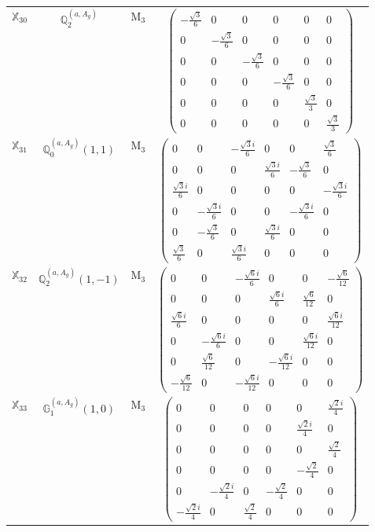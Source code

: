 \documentclass[fleqn,10pt,landscape]{article}
\begin{document}
\begin{itemize}
\begin{center}
\begin{longtable}{c|c|c|c}
$ \mathbb{X}_{30} $ & $\mathbb{Q}_{2}^{(a,A_{g})}$ & M$_{3}$ & $\begin{pmatrix} - \frac{\sqrt{3}}{6} & 0 & 0 & 0 & 0 & 0 \\ 0 & - \frac{\sqrt{3}}{6} & 0 & 0 & 0 & 0 \\ 0 & 0 & - \frac{\sqrt{3}}{6} & 0 & 0 & 0 \\ 0 & 0 & 0 & - \frac{\sqrt{3}}{6} & 0 & 0 \\ 0 & 0 & 0 & 0 & \frac{\sqrt{3}}{3} & 0 \\ 0 & 0 & 0 & 0 & 0 & \frac{\sqrt{3}}{3} \end{pmatrix}$ \\
$ \mathbb{X}_{31} $ & $\mathbb{Q}_{0}^{(a,A_{g})}(1,1)$ & M$_{3}$ & $\begin{pmatrix} 0 & 0 & - \frac{\sqrt{3} i}{6} & 0 & 0 & \frac{\sqrt{3}}{6} \\ 0 & 0 & 0 & \frac{\sqrt{3} i}{6} & - \frac{\sqrt{3}}{6} & 0 \\ \frac{\sqrt{3} i}{6} & 0 & 0 & 0 & 0 & - \frac{\sqrt{3} i}{6} \\ 0 & - \frac{\sqrt{3} i}{6} & 0 & 0 & - \frac{\sqrt{3} i}{6} & 0 \\ 0 & - \frac{\sqrt{3}}{6} & 0 & \frac{\sqrt{3} i}{6} & 0 & 0 \\ \frac{\sqrt{3}}{6} & 0 & \frac{\sqrt{3} i}{6} & 0 & 0 & 0 \end{pmatrix}$ \\
$ \mathbb{X}_{32} $ & $\mathbb{Q}_{2}^{(a,A_{g})}(1,-1)$ & M$_{3}$ & $\begin{pmatrix} 0 & 0 & - \frac{\sqrt{6} i}{6} & 0 & 0 & - \frac{\sqrt{6}}{12} \\ 0 & 0 & 0 & \frac{\sqrt{6} i}{6} & \frac{\sqrt{6}}{12} & 0 \\ \frac{\sqrt{6} i}{6} & 0 & 0 & 0 & 0 & \frac{\sqrt{6} i}{12} \\ 0 & - \frac{\sqrt{6} i}{6} & 0 & 0 & \frac{\sqrt{6} i}{12} & 0 \\ 0 & \frac{\sqrt{6}}{12} & 0 & - \frac{\sqrt{6} i}{12} & 0 & 0 \\ - \frac{\sqrt{6}}{12} & 0 & - \frac{\sqrt{6} i}{12} & 0 & 0 & 0 \end{pmatrix}$ \\
$ \mathbb{X}_{33} $ & $\mathbb{G}_{1}^{(a,A_{g})}(1,0)$ & M$_{3}$ & $\begin{pmatrix} 0 & 0 & 0 & 0 & 0 & \frac{\sqrt{2} i}{4} \\ 0 & 0 & 0 & 0 & \frac{\sqrt{2} i}{4} & 0 \\ 0 & 0 & 0 & 0 & 0 & \frac{\sqrt{2}}{4} \\ 0 & 0 & 0 & 0 & - \frac{\sqrt{2}}{4} & 0 \\ 0 & - \frac{\sqrt{2} i}{4} & 0 & - \frac{\sqrt{2}}{4} & 0 & 0 \\ - \frac{\sqrt{2} i}{4} & 0 & \frac{\sqrt{2}}{4} & 0 & 0 & 0 \end{pmatrix}$ \\

\end{longtable}
\end{center}
\end{itemize}
\end{document}
